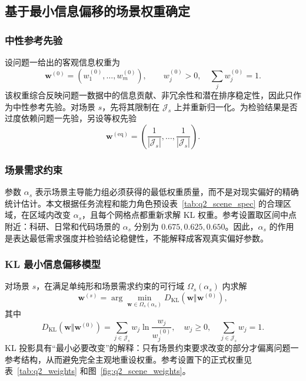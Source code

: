 \subsection{基于最小信息偏移的场景权重确定}

\subsubsection{中性参考先验}

设问题一给出的客观信息权重为
\begin{equation}
\boldsymbol w^{(0)}=(w_1^{(0)},\ldots,w_m^{(0)}),
\qquad w_j^{(0)}>0,\quad \sum_j w_j^{(0)}=1.
\label{eq:q2_q1_prior}
\end{equation}
该权重综合反映问题一数据中的信息贡献、非冗余性和潜在排序稳定性，因此只作为中性参考先验。对场景 $s$，先将其限制在 $\mathcal J_s$ 上并重新归一化。为检验结果是否过度依赖问题一先验，另设等权先验
\begin{equation}
\boldsymbol w^{(\mathrm{eq})}
=\left(\frac{1}{|\mathcal J_s|},\ldots,\frac{1}{|\mathcal J_s|}\right).
\label{eq:q2_equal_prior}
\end{equation}

\subsubsection{场景需求约束}

参数 $\alpha_s$ 表示场景主导能力组必须获得的最低权重质量，而不是对现实偏好的精确统计估计。本文根据任务流程和能力角色预设表~\ref{tab:q2_scene_spec} 的合理区域，在区域内改变 $\alpha_s$，且每个网格点都重新求解 KL 权重。参考设置取区间中点附近：科研、日常和代码场景的 $\alpha_s$ 分别为 $0.675,0.625,0.650$。因此，$\alpha_s$ 的作用是表达最低需求强度并检验结论稳健性，不能解释成客观真实偏好参数。

\subsubsection{KL 最小信息偏移模型}

对场景 $s$，在满足单纯形和场景需求约束的可行域 $\Omega_s(\alpha_s)$ 内求解
\begin{equation}
\boxed{
\boldsymbol w^{(s)}
=\arg\min_{\boldsymbol w\in\Omega_s(\alpha_s)}
D_{\mathrm{KL}}\!\left(\boldsymbol w\Vert\boldsymbol w^{(0)}\right)
},
\label{eq:q2_kl_model}
\end{equation}
其中
\begin{equation}
D_{\mathrm{KL}}\!\left(\boldsymbol w\Vert\boldsymbol w^{(0)}\right)
=\sum_{j\in\mathcal J_s}w_j\ln\frac{w_j}{w_j^{(0)}},
\quad w_j\geq0,
\quad \sum_{j\in\mathcal J_s}w_j=1.
\label{eq:q2_kl_divergence}
\end{equation}
KL 投影具有“最小必要改变”的解释：只有场景约束要求改变的部分才偏离问题一参考结构，从而避免完全主观地重设权重。参考设置下的正式权重见表~\ref{tab:q2_weights} 和图~\ref{fig:q2_scene_weights}。


